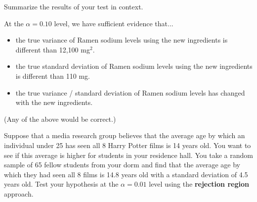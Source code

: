 \documentclass[noanswers]{exam}
\begin{document}
\begin{questions}
\begin{solution}[\stretch{1}]
	\end{solution}
	
	
	\question Summarize the results of your test in context.
	
	\begin{solution}[\stretch{1}]
	
	\vspace{1mm}
	
	At the $\alpha=0.10$ level, we have sufficient evidence that...
	\begin{itemize}
	\item the true variance of Ramen sodium levels using the new ingredients is different than 12,100 mg$^2$.
	\item the true standard deviation of Ramen sodium levels using the new ingredients is different than 110 mg.
	\item the true variance / standard deviation of Ramen sodium levels has changed with the new ingredients.
	\end{itemize}
	(Any of the above would be correct.)
	\end{solution}
	
\newpage

\question Suppose that a media research group believes that the average age by which an individual under 25 has seen all 8 Harry Potter films is 14 years old. You want to see if this average is higher for students in your residence hall. You take a random sample of 65 fellow students from your dorm and find that the average age by which they had seen all 8 films is 14.8 years old with a standard deviation of 4.5 years old. Test your hypothesis at the $\alpha=0.01$ level using the \textbf{rejection region} approach.

\vspace{3mm}

\end{questions}
\end{document}
